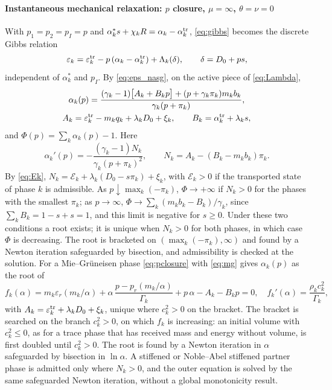 \documentclass[a4paper,fleqn]{cas-sc}
\begin{document}
\paragraph{Instantaneous mechanical relaxation: $p$ closure, $\mu=\infty$, $\theta=\nu=0$}
With $p_1=p_2=p_I=p$ and $\alpha^*_ks+\chi_kR=\alpha_k-\alpha^{\rm tr}_k$, \eqref{eq:gibbs} becomes the discrete Gibbs relation
\begin{equation}
\varepsilon_k=\varepsilon^{\rm tr}_k-p\,(\alpha_k-\alpha^{\rm tr}_k)+\Lambda_k(\delta),\qquad \delta=D_0+ps ,
\label{eq:pclosure}
\end{equation}
independent of $\alpha^*_k$ and $p_I$. By \eqref{eq:eps_nasg}, on the active piece of \eqref{eq:Lambda},
\begin{equation}
\begin{gathered}
\alpha_k(p)=\frac{(\gamma_k-1)\big[A_k+B_kp\big]+(p+\gamma_k\pi_k)m_kb_k}{\gamma_k(p+\pi_k)},\\
A_k=\varepsilon^{\rm tr}_k-m_kq_k+\lambda_kD_0+\xi_k,\qquad B_k=\alpha^{\rm tr}_k+\lambda_ks ,
\end{gathered}
\label{eq:alpha_p}
\end{equation}
and $\Phi(p)=\sum_k\alpha_k(p)-1$. Here
\[
\alpha_k'(p)=-\frac{(\gamma_k-1)N_k}{\gamma_k(p+\pi_k)^2},\qquad N_k=A_k-(B_k-m_kb_k)\pi_k .
\]
By \eqref{eq:Ek}, $N_k=\mathcal E_k+\lambda_k(D_0-s\pi_k)+\xi_k$, with $\mathcal E_k>0$ if the transported state of phase $k$ is admissible.
As $p\downarrow\max_k(-\pi_k)$, $\Phi\to+\infty$ if $N_k>0$ for the phases with the smallest $\pi_k$; as $p\to\infty$,
$\Phi\to\sum_k(m_kb_k-B_k)/\gamma_k$, since $\sum_kB_k=1-s+s=1$, and this limit is negative for $s\ge0$. Under these two
conditions a root exists; it is unique when $N_k>0$ for both phases, in which case $\Phi$ is decreasing. The root is
bracketed on $(\max_k(-\pi_k),\infty)$ and found by a Newton iteration safeguarded by bisection, and admissibility is checked at the
solution. For a Mie--Gr\"uneisen phase \eqref{eq:pclosure} with \eqref{eq:mg} gives $\alpha_k(p)$ as the root of
\[
f_k(\alpha)=m_k\varepsilon_r(m_k/\alpha)+\alpha\,\frac{p-p_r(m_k/\alpha)}{\Gamma_k}+p\,\alpha-A_k-B_kp=0,\quad
f_k'(\alpha)=\frac{\rho_kc_k^2}{\Gamma_k} ,
\]
with $A_k=\varepsilon^{\rm tr}_k+\lambda_kD_0+\xi_k$, unique where $c_k^2>0$ on the bracket. The bracket is searched on the branch
$c_k^2>0$, on which $f_k$ is increasing: an initial volume with $c_k^2\le0$, as for a trace phase that has received mass and energy
without volume, is first doubled until $c_k^2>0$. The root is found by a Newton iteration in $\alpha$ safeguarded by bisection
in $\ln\alpha$. A stiffened or Noble--Abel stiffened partner phase is admitted only where $N_k>0$, and the outer
equation is solved by the same safeguarded Newton iteration, without a global monotonicity result.
\end{document}
